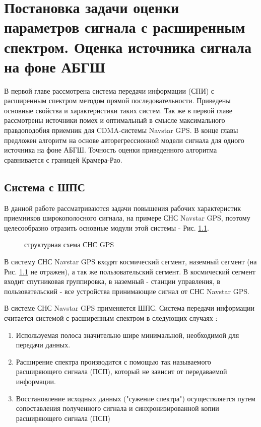 \chapter{Постановка задачи оценки параметров сигнала с расширенным спектром. Оценка источника сигнала на фоне АБГШ}

В первой главе рассмотрена система передачи информации (СПИ) с расширенным спектром методом прямой последовательности. Приведены основные свойства и характеристики
таких систем. Так же в первой главе рассмотрены источники помех и оптимальный в смысле максимального правдоподобия приемник для CDMA-системы Navstar GPS. В конце главы
предложен алгоритм на основе авторегрессионной модели сигнала для одного источника на фоне АБГШ. Точность оценки приведенного алгоритма сравнивается с границей Крамера-Рао. 

\section{Система с ШПС}
В данной работе рассматриваются задачи повышения рабочих характеристик приемников широкополосного сигнала, на примере СНС Navstar GPS,
поэтому целесообразно отразить основные модули этой системы - Рис. \ref{pic:sec1_gnss_system}.
\begin{figure}[h]
	\center{}
	\caption{структурная схема СНС GPS}
	\label{pic:sec1_gnss_system}
\end{figure}

В систему СНС Navstar GPS входят космический сегмент, наземный сегмент (на Рис. \ref{pic:sec1_gnss_system} не
отражен), а так же пользовательский сегмент. В космический сегмент входит спутниковая группировка, в 
наземный - станции управления, в пользовательский - все устройства принимающие сигнал от СНС Navstar GPS.

В системе СНС Navstar GPS применяется ШПС. Система передачи информации считается системой с расширенным спектром в следующих случаях \cite{sklyar}:
\begin{enumerate}
	\item Используемая полоса значительно шире минимальной, необходимой для передачи данных.
	\item Расширение спектра производится с помощью так называемого расширяющего сигнала (ПСП),
		который не зависит от передаваемой информации.
	\item Восстановление исходных данных ("сужение спектра") осуществляется путем сопоставления полученного
		сигнала и синхронизированной копии расширяющего сигнала (ПСП)
\end{enumerate}

